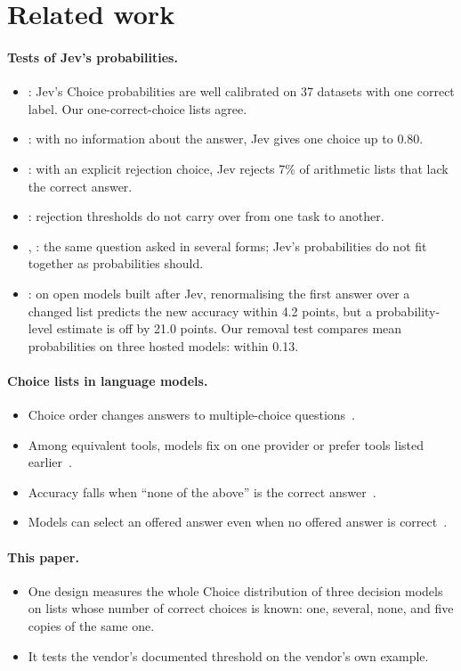 \section{Related work}
\paragraph{Tests of Jev's probabilities.}
\begin{itemize}
\item \citet{deusser2026evaluating}: Jev's Choice probabilities are well calibrated on 37 datasets with one correct label. Our one-correct-choice lists agree.
\item \citet{shankaranarayana2026beyond}: with no information about the answer, Jev gives one choice up to 0.80.
\item \citet{zhong2026when}: with an explicit rejection choice, Jev rejects 7\% of arithmetic lists that lack the correct answer.
\item \citet{lu2026benchmarking}: rejection thresholds do not carry over from one task to another.
\item \citet{porcedda2026jev}, \citet{li2026beyond}: the same question asked in several forms; Jev's probabilities do not fit together as probabilities should.
\item \citet{li2026readout}: on open models built after Jev, renormalising the first answer over a changed list predicts the new accuracy within 4.2 points, but a probability-level estimate is off by 21.0 points. Our removal test compares mean probabilities on three hosted models: within 0.13.
\end{itemize}

\paragraph{Choice lists in language models.}
\begin{itemize}
\item Choice order changes answers to multiple-choice questions~\citep{zheng2024large,pezeshkpour2024large}.
\item Among equivalent tools, models fix on one provider or prefer tools listed earlier~\citep{blankenstein2026biasbusters}.
\item Accuracy falls when ``none of the above'' is the correct answer~\citep{tam2025none}.
\item Models can select an offered answer even when no offered answer is correct~\citep{wang2025leastincorrect}.
\end{itemize}

\paragraph{This paper.}
\begin{itemize}
\item One design measures the whole Choice distribution of three decision models on lists whose number of correct choices is known: one, several, none, and five copies of the same one.
\item It tests the vendor's documented threshold on the vendor's own example.
\end{itemize}
